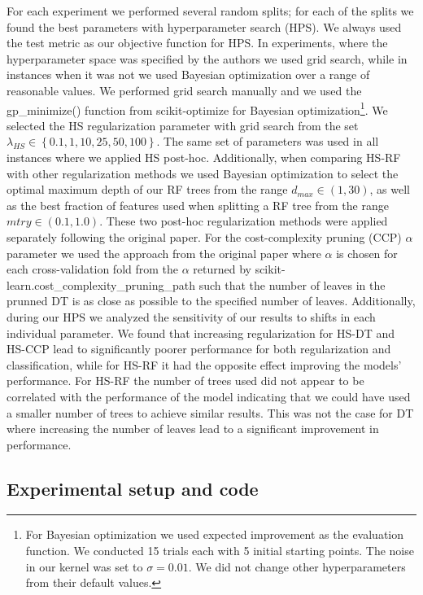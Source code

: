 For each experiment we performed several random splits; for each of the splits we found the best parameters with hyperparameter search (HPS). 
We always used the test metric as our objective function for HPS. 
In experiments, where the hyperparameter space was specified by the authors we used grid search, while in instances when it was not we used Bayesian optimization over a range of reasonable values. We performed grid search manually and we used the {\sf gp\_minimize()} function from {\sf scikit-optimize} for Bayesian optimization\footnote{For Bayesian optimization we used expected improvement as the evaluation function. We conducted 15 trials each with 5 initial starting points. The noise in our kernel was set to $\sigma=0.01$. We did not change other hyperparameters from their default values.}. 
We selected the HS regularization parameter with grid search from the set $\lambda_{HS} \in \left\{ 0.1, 1, 10, 25, 50, 100 \right\}$.
The same set of parameters was used in all instances where we applied HS post-hoc.
Additionally, when comparing HS-RF with other regularization methods we used Bayesian optimization to select the optimal maximum depth of our RF trees from the range $d_{max} \in (1, 30)$, as well as the best fraction of features used when splitting a RF tree from the range $mtry \in (0.1, 1.0)$.
These two post-hoc regularization methods were applied separately following the original paper.
For the cost-complexity pruning (CCP) $\alpha$ parameter we used the approach from the original paper where $\alpha$ is chosen for each cross-validation fold from the $\alpha$ returned by {\sf scikit-learn.cost\_complexity\_pruning\_path} such that the number of leaves in the prunned DT is as close as possible to the specified number of leaves.
Additionally, during our HPS we analyzed the sensitivity of our results to shifts in each individual parameter.
We found that increasing regularization for HS-DT and HS-CCP lead to significantly poorer performance for both regularization and classification, while for HS-RF it had the opposite effect improving the models' performance.
For HS-RF the number of trees used did not appear to be correlated with the performance of the model indicating that we could have used a smaller number of trees to achieve similar results. This was not the case for DT where increasing the number of leaves lead to a significant improvement in performance.



\subsection{Experimental setup and code}

